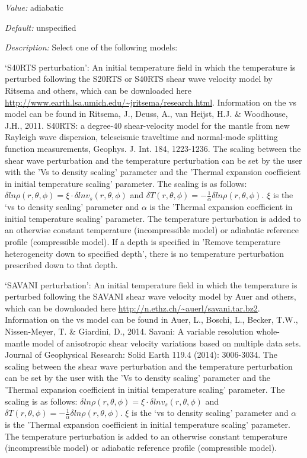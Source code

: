 \begin{itemize}
{\it Value:} adiabatic


{\it Default:} unspecified


{\it Description:} Select one of the following models:

`S40RTS perturbation': An initial temperature field in which the temperature is perturbed following the S20RTS or S40RTS shear wave velocity model by Ritsema and others, which can be downloaded here \url{http://www.earth.lsa.umich.edu/~jritsema/research.html}. Information on the vs model can be found in Ritsema, J., Deuss, A., van Heijst, H.J. \& Woodhouse, J.H., 2011. S40RTS: a degree-40 shear-velocity model for the mantle from new Rayleigh wave dispersion, teleseismic traveltime and normal-mode splitting function measurements, Geophys. J. Int. 184, 1223-1236. The scaling between the shear wave perturbation and the temperature perturbation can be set by the user with the 'Vs to density scaling' parameter and the 'Thermal expansion coefficient in initial temperature scaling' parameter. The scaling is as follows: $\delta ln \rho (r,\theta,\phi) = \xi \cdot \delta ln v_s(r,\theta, \phi)$ and $\delta T(r,\theta,\phi) = - \frac{1}{\alpha} \delta ln \rho(r,\theta,\phi)$. $\xi$ is the `vs to density scaling' parameter and $\alpha$ is the 'Thermal expansion coefficient in initial temperature scaling' parameter. The temperature perturbation is added to an otherwise constant temperature (incompressible model) or adiabatic reference profile (compressible model). If a depth is specified in 'Remove temperature heterogeneity down to specified depth', there is no temperature perturbation prescribed down to that depth.

`SAVANI perturbation': An initial temperature field in which the temperature is perturbed following the SAVANI shear wave velocity model by Auer and others, which can be downloaded here \url{http://n.ethz.ch/~auerl/savani.tar.bz2}. Information on the vs model can be found in Auer, L., Boschi, L., Becker, T.W., Nissen-Meyer, T. \& Giardini, D., 2014. Savani: A variable resolution whole-mantle model of anisotropic shear velocity variations based on multiple data sets. Journal of Geophysical Research: Solid Earth 119.4 (2014): 3006-3034. The scaling between the shear wave perturbation and the temperature perturbation can be set by the user with the 'Vs to density scaling' parameter and the 'Thermal expansion coefficient in initial temperature scaling' parameter. The scaling is as follows: $\delta ln \rho (r,\theta,\phi) = \xi \cdot \delta ln v_s(r,\theta, \phi)$ and $\delta T(r,\theta,\phi) = - \frac{1}{\alpha} \delta ln \rho(r,\theta,\phi)$. $\xi$ is the `vs to density scaling' parameter and $\alpha$ is the 'Thermal expansion coefficient in initial temperature scaling' parameter. The temperature perturbation is added to an otherwise constant temperature (incompressible model) or adiabatic reference profile (compressible model).


\end{itemize}
